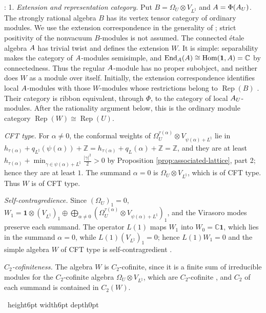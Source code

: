 \documentclass[leqno]{article}
\newcommand{\Cbb}{\ensuremath{\mathbb{C}}}
\let\cal\relax
\newcommand{\cal}{\mathcal}
\newcommand{\Z}{\ensuremath{\mathbb{Z}}}
\newcommand{\qed}{\hfill \vrule height6pt  width6pt depth0pt}
\newcommand{\ot}{\otimes}
\DeclareMathOperator{\Rep}{Rep}
\newenvironment{proof}[1][]{\noindent {\it Proof #1} : }{\hbox{~}\qed
\smallskip
}
\numberwithin{equation}{section}
\begin{document}
\begin{proof}
1. \emph{Extension and representation category.} Put $B = \Omega_U \ot V_{L^\natural}$ and $\cal A = \Phi(\cal A_U)$. The strongly rational algebra $B$ has its vertex tensor category of ordinary modules. We use the extension correspondence in the generality of \cite[Theorem 3.2 and Remark 3.3]{HKL15}; strict positivity of the nonvacuum $B$-modules is not assumed. The connected étale algebra $\cal A$ has trivial twist and defines the extension $W$. It is simple: separability makes the category of $\cal A$-modules semisimple, and $\operatorname{End}_{\cal A}(\cal A) \cong \operatorname{Hom}(\mathbf 1,\cal A) = \Cbb$ by connectedness. Thus the regular $\cal A$-module has no proper subobject, and neither does $W$ as a module over itself. Initially, the extension correspondence identifies local $\cal A$-modules with those $W$-modules whose restrictions belong to $\Rep(B)$ \cite{HKL15,CKM22}. Their category is ribbon equivalent, through $\Phi$, to the category of local $\cal A_U$-modules. After the rationality argument below, this is the ordinary module category $\Rep(W) \cong \Rep(U)$.

\emph{CFT type.} For $\alpha \neq 0$, the conformal weights of $\Omega_U^{\tau(\alpha)} \ot V_{\psi(\alpha)+L^\natural}$ lie in $h_{\tau(\alpha)}+q_{L^\natural}(\psi(\alpha))+\Z = h_{\tau(\alpha)}+q_L(\alpha)+\Z = \Z$, and they are at least $h_{\tau(\alpha)}+\min_{\gamma \in \psi(\alpha)+L^\natural}\frac{|\gamma|^2}2 > 0$ by Proposition \ref{prop:associated-lattice}, part 2; hence they are at least $1$. The summand $\alpha = 0$ is $\Omega_U \ot V_{L^\natural}$, which is of CFT type. Thus $W$ is of CFT type.

\emph{Self-contragredience.} Since $(\Omega_U)_1 = 0$, $W_1 = \mathbf 1 \ot (V_{L^\natural})_1 \oplus \bigoplus_{\alpha \neq 0}(\Omega_U^{\tau(\alpha)} \ot V_{\psi(\alpha)+L^\natural})_1$, and the Virasoro modes preserve each summand. The operator $L(1)$ maps $W_1$ into $W_0 = \Cbb\mathbf 1$, which lies in the summand $\alpha = 0$, while $L(1)(V_{L^\natural})_1 = 0$; hence $L(1)W_1 = 0$ and the simple algebra $W$ of CFT type is self-contragredient \cite{Li94}.

\emph{$C_2$-cofiniteness.} The algebra $W$ is $C_2$-cofinite, since it is a finite sum of irreducible modules for the $C_2$-cofinite algebra $\Omega_U \ot V_{L^\natural}$, which are $C_2$-cofinite \cite{Buh02}, and $C_2$ of each summand is contained in $C_2(W)$.


\end{proof}
\end{document}
